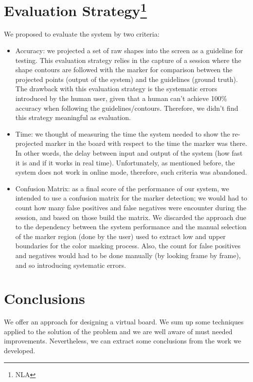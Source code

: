 \documentclass[a4paper,12pt]{article}
\begin{document}
\section[Evaluation Strategy]{Evaluation Strategy\footnote{NLA}}
We proposed to evaluate the system by two criteria:
\begin{itemize}
\item Accuracy: we projected a set of raw shapes into the screen as a guideline for testing. This evaluation strategy relies in the capture of a session where the shape contours are followed with the marker for comparison between the projected points (output of the system) and the guidelines (ground truth). The drawback with this evaluation strategy is the systematic errors introduced by the human user, given that a human can't achieve 100\% accuracy when following the guidelines/contours. Therefore, we didn't find this strategy meaningful as evaluation. 
\item Time: we thought of measuring the time the system needed to show the re-projected marker in the board with respect to the time the marker was there. In other words, the delay between input and output of the system (how fast it is and if it works in real time). Unfortunately, as mentioned before, the system does not work in online mode, therefore, such criteria was abandoned.
\item Confusion Matrix: as a final score of the performance of our system, we intended to use a confusion matrix for the marker detection; we would had to count how many false positives and false negatives were encounter during the session, and based on those build the matrix. We discarded the approach due to the dependency between the system performance and the manual selection of the marker region (done by the user) used to extract low and upper boundaries for the color masking process. Also, the count for false positives and negatives would had to be done manually (by looking frame by frame), and so introducing systematic errors.
\end{itemize}
\section[Conclusions]{Conclusions}
We offer an approach for designing a virtual board. We sum up some techniques applied to the solution of the problem and we are well aware of must needed improvements. Nevertheless, we can extract some conclusions from the work we developed.
\end{document}
